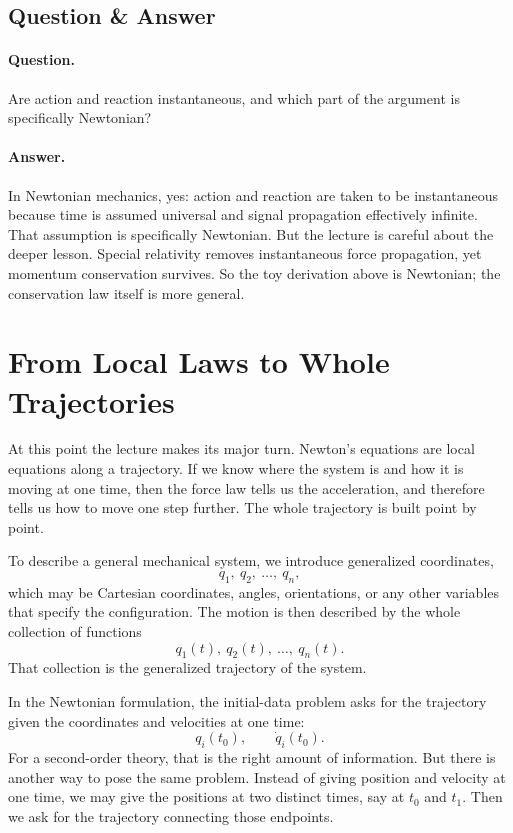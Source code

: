 \subsection{Question \& Answer}

\paragraph{Question.} Are action and reaction instantaneous, and which part of the argument is specifically Newtonian?

\paragraph{Answer.} In Newtonian mechanics, yes: action and reaction are taken to be instantaneous because time is assumed universal and signal propagation effectively infinite. That assumption is specifically Newtonian. But the lecture is careful about the deeper lesson. Special relativity removes instantaneous force propagation, yet momentum conservation survives. So the toy derivation above is Newtonian; the conservation law itself is more general.

\section{From Local Laws to Whole Trajectories}

At this point the lecture makes its major turn. Newton's equations are local equations along a trajectory. If we know where the system is and how it is moving at one time, then the force law tells us the acceleration, and therefore tells us how to move one step further. The whole trajectory is built point by point.

To describe a general mechanical system, we introduce generalized coordinates,
\begin{equation}
q_1,\ q_2,\ \dots,\ q_n,
\end{equation}
which may be Cartesian coordinates, angles, orientations, or any other variables that specify the configuration. The motion is then described by the whole collection of functions
\begin{equation}
q_1(t),\ q_2(t),\ \dots,\ q_n(t).
\end{equation}
That collection is the generalized trajectory of the system.

In the Newtonian formulation, the initial-data problem asks for the trajectory given the coordinates and velocities at one time:
\begin{equation}
q_i(t_0),\qquad \dot q_i(t_0).
\end{equation}
For a second-order theory, that is the right amount of information. But there is another way to pose the same problem. Instead of giving position and velocity at one time, we may give the positions at two distinct times, say at \(t_0\) and \(t_1\). Then we ask for the trajectory connecting those endpoints.

